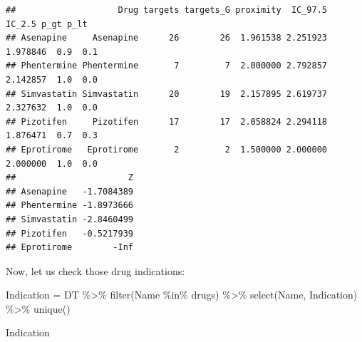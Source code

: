 \documentclass[
]{book}
\newenvironment{Shaded}{\begin{snugshade}}{\end{snugshade}}
\newcommand{\FunctionTok}[1]{\textcolor[rgb]{0.00,0.00,0.00}{#1}}
\newcommand{\NormalTok}[1]{#1}
\newcommand{\OtherTok}[1]{\textcolor[rgb]{0.56,0.35,0.01}{#1}}
\newcommand{\SpecialCharTok}[1]{\textcolor[rgb]{0.00,0.00,0.00}{#1}}
\begin{document}
\begin{verbatim}
##                    Drug targets targets_G proximity  IC_97.5   IC_2.5 p_gt p_lt
## Asenapine     Asenapine      26        26  1.961538 2.251923 1.978846  0.9  0.1
## Phentermine Phentermine       7         7  2.000000 2.792857 2.142857  1.0  0.0
## Simvastatin Simvastatin      20        19  2.157895 2.619737 2.327632  1.0  0.0
## Pizotifen     Pizotifen      17        17  2.058824 2.294118 1.876471  0.7  0.3
## Eprotirome   Eprotirome       2         2  1.500000 2.000000 2.000000  1.0  0.0
##                      Z
## Asenapine   -1.7084389
## Phentermine -1.8973666
## Simvastatin -2.8460499
## Pizotifen   -0.5217939
## Eprotirome        -Inf
\end{verbatim}

Now, let us check those drug indications:

\begin{Shaded}
\begin{Highlighting}[]
\NormalTok{Indication }\OtherTok{=}\NormalTok{ DT }\SpecialCharTok{\%\textgreater{}\%} 
  \FunctionTok{filter}\NormalTok{(Name }\SpecialCharTok{\%in\%}\NormalTok{ drugs) }\SpecialCharTok{\%\textgreater{}\%} 
  \FunctionTok{select}\NormalTok{(Name, Indication) }\SpecialCharTok{\%\textgreater{}\%} 
  \FunctionTok{unique}\NormalTok{()}

\NormalTok{Indication}
\end{Highlighting}
\end{Shaded}
\end{document}
